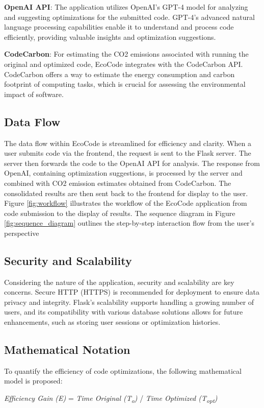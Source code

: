 \documentclass[conference,compsoc]{IEEEtran}
\begin{document}
\textbf{OpenAI API}: The application utilizes OpenAI's GPT-4 model for analyzing and suggesting optimizations for the submitted  code. GPT-4's advanced natural language processing capabilities enable it to understand and process code efficiently, providing valuable insights and optimization suggestions.

\textbf{CodeCarbon}: For estimating the CO2 emissions associated with running the original and optimized code, EcoCode integrates with the CodeCarbon API. CodeCarbon offers a way to estimate the energy consumption and carbon footprint of computing tasks, which is crucial for assessing the environmental impact of software.

\subsection{Data Flow}
The data flow within EcoCode is streamlined for efficiency and clarity. When a user submits  code via the frontend, the request is sent to the Flask server. The server then forwards the code to the OpenAI API for analysis. The response from OpenAI, containing optimization suggestions, is processed by the server and combined with CO2 emission estimates obtained from CodeCarbon. The consolidated results are then sent back to the frontend for display to the user.
Figure \ref{fig:workflow} illustrates the workflow of the EcoCode application from code submission to the display of results.
The sequence diagram in Figure \ref{fig:sequence_diagram} outlines the step-by-step interaction flow from the user's perspective
\subsection{Security and Scalability}
Considering the nature of the application, security and scalability are key concerns. Secure HTTP (HTTPS) is recommended for deployment to ensure data privacy and integrity. Flask's scalability supports handling a growing number of users, and its compatibility with various database solutions allows for future enhancements, such as storing user sessions or optimization histories.

\subsection{Mathematical Notation}
To quantify the efficiency of code optimizations, the following mathematical model is proposed:

\textit{Efficiency Gain (E)} = \textit{Time Original (T\textsubscript{o})} / \textit{Time Optimized (T\textsubscript{opt})}
\end{document}
